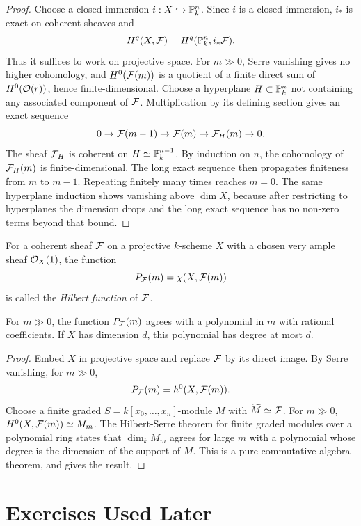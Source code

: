 \begin{proof}
Choose a closed immersion \(i:X\hookrightarrow\mathbb{P}^n_k\).  Since \(i\) is a
closed immersion, \(i_*\) is exact on coherent sheaves and
\[
    H^q(X,\mathcal{F})=H^q(\mathbb{P}^n_k,i_*\mathcal{F}).
\]
Thus it suffices to work on projective space.  For \(m\gg0\), Serre vanishing
gives no higher cohomology, and \(H^0(\mathcal{F}(m))\) is a quotient of a finite direct
sum of \(H^0(\mathcal{O}(r))\), hence finite-dimensional.  Choose a hyperplane
\(H\subset\mathbb{P}^n_k\) not containing any associated component of \(\mathcal{F}\).
Multiplication by its defining section gives an exact sequence
\[
    0\to\mathcal{F}(m-1)\to\mathcal{F}(m)\to \mathcal{F}_H(m)\to0.
\]
The sheaf \(\mathcal{F}_H\) is coherent on \(H\simeq\mathbb{P}^{n-1}_k\).  By induction on
\(n\), the cohomology of \(\mathcal{F}_H(m)\) is finite-dimensional.  The long exact
sequence then propagates finiteness from \(m\) to \(m-1\).  Repeating finitely
many times reaches \(m=0\).  The same hyperplane induction shows vanishing
above \(\dim X\), because after restricting to hyperplanes the dimension drops
and the long exact sequence has no non-zero terms beyond that bound.
\end{proof}

\begin{definition}
For a coherent sheaf \(\mathcal{F}\) on a projective \(k\)-scheme \(X\) with a chosen
very ample sheaf \(\mathcal{O}_X(1)\), the function
\[
    P_{\mathcal{F}}(m)=\chi(X,\mathcal{F}(m))
\]
is called the \emph{Hilbert function} of \(\mathcal{F}\).
\end{definition}

\begin{theorem}
For \(m\gg0\), the function \(P_{\mathcal{F}}(m)\) agrees with a polynomial in \(m\) with
rational coefficients.  If \(X\) has dimension \(d\), this polynomial has
degree at most \(d\).
\end{theorem}

\begin{proof}
Embed \(X\) in projective space and replace \(\mathcal{F}\) by its direct image.  By
Serre vanishing, for \(m\gg0\),
\[
    P_{\mathcal{F}}(m)=h^0(X,\mathcal{F}(m)).
\]
Choose a finite graded \(S=k[x_0,\ldots,x_n]\)-module \(M\) with
\(\widetilde M\simeq\mathcal{F}\).  For \(m\gg0\), \(H^0(X,\mathcal{F}(m))\simeq M_m\).  The
Hilbert-Serre theorem for finite graded modules over a polynomial ring states
that \(\dim_k M_m\) agrees for large \(m\) with a polynomial whose degree is the
dimension of the support of \(M\).  This is a pure commutative algebra theorem,
and gives the result.
\end{proof}

\section{Exercises Used Later}

